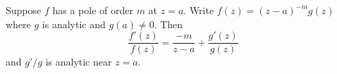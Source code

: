 Suppose $f$ has a pole of order $m$ at $z = a$. Write $f(z) = (z-a)^{-m} g(z)$ where $g$ is analytic and $g(a) \neq 0$. Then
$$\frac{f'(z)}{f(z)} = \frac{-m}{z-a} + \frac{g'(z)}{g(z)}$$
and $g'/g$ is analytic near $z = a$.
